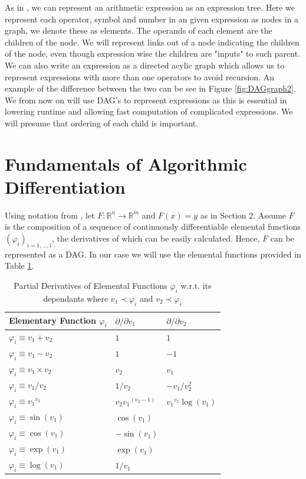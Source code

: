 \documentclass{article}
\begin{document}
As in \cite{PoPBook}, we can represent an arithmetic expression as an expression tree. Here we represent each operator, symbol and number in an given expression as nodes in a graph, we denote these as elements. The operands of each element are the children of the node. We will represent links out of a node indicating the children of the node, even though expression wise the children are "inputs" to such parent. We can also write an expression as a directed acylic graph which allows us to represent expressions with more than one operators to avoid recursion. An example of the difference between the two can be see in Figure \ref{fig:DAGgraph2}. We from now on will use DAG's to represent expressions as this is essential in lowering runtime and allowing fast computation of complicated expressions. We will presume that ordering of each child is important.

\section{Fundamentals of Algorithmic Differentiation}

Using notation from \cite{evald}, let $F: \mathbb{R}^n \rightarrow \mathbb{R}^m$ and $F(x) = y$ as in Section 2. Assume $F$ is the composition of a sequence of continuously differentiable elemental functions $(\varphi_i)_{i=1,\ldots, l}$, the derivatives of which can be easily calculated. Hence, $F$ can be represented as a DAG. In our case we will use the elemental functions provided in Table \ref{tab:elemental}.

\begin{table}[h]
    \centering
    \begin{tabular}{|lll|}
        \hline
        Elementary Function $\varphi_i$ & $\partial / \partial {v}_1$ & $\partial / \partial {v}_2$ \\
        \hline
        $\varphi_i \equiv v_1+v_2$ & $1$ & $1$ \\
        $\varphi_i \equiv v_1-v_2$ & $1$ & $-1$ \\
        $\varphi_i \equiv v_1 \times v_2$ & $v_2$ & $v_1$ \\
        $\varphi_i \equiv v_1 / v_2$ & $1/v_2$ & $-v_1/v_2^2$ \\
        $\varphi_i \equiv {v_1}^{v_2}$ & $v_2{v_1}^{(v_2-1)}$ & ${v_1}^{v_2}\log(v_1)$ \\
        $\varphi_i \equiv \sin(v_1)$ & $\cos(v_1)$ &  \\
        $\varphi_i \equiv \cos(v_1)$ & $-\sin(v_1)$ &  \\
        $\varphi_i \equiv \exp(v_1)$ & $\exp(v_1)$ &  \\
        $\varphi_i \equiv \log(v_1)$ & $1/v_1$ &  \\
        \hline
    \end{tabular}
    \caption{Partial Derivatives of Elemental Functions $\varphi_i$ w.r.t. its dependants where ${v}_1 \prec \varphi_i$ and ${v}_2 \prec \varphi_i$}
    \label{tab:elemental}
\end{table}
\end{document}
